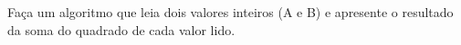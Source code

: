 
\question[10]

Faça um algoritmo que leia dois valores inteiros (A e B) e apresente o resultado da soma do quadrado de cada valor lido.

